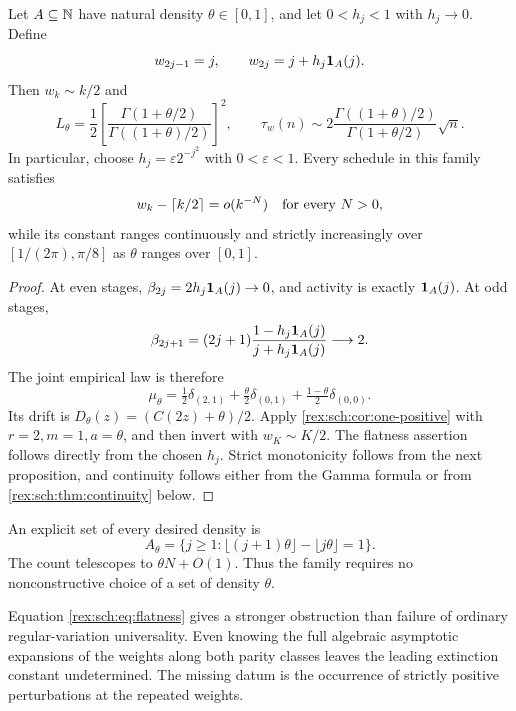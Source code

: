 \begin{theorem}
\label{rex:sch:thm:flat-perturbation}
Let $A\subseteq\mathbb N$ have natural density $\theta\in[0,1]$, and let
$0<h_j<1$ with $h_j\to0$. Define
\begin{equation}\label{rex:sch:eq:density-weights}
 w_{2j-1}=j,\qquad w_{2j}=j+h_j\mathbf 1_A(j).
\end{equation}
Then $w_k\sim k/2$ and
\begin{equation}\label{rex:sch:eq:density-L}
 \boxed{\displaystyle
 L_\theta=\frac12
 \left[\frac{\Gamma(1+\theta/2)}
 {\Gamma((1+\theta)/2)}\right]^2,\qquad
 \tau_w(n)\sim
 2\frac{\Gamma((1+\theta)/2)}{\Gamma(1+\theta/2)}\sqrt n.}
\end{equation}
In particular, choose $h_j=\varepsilon2^{-j^2}$ with $0<\varepsilon<1$.
Every schedule in this family satisfies
\begin{equation}\label{rex:sch:eq:flatness}
 w_k-\left\lceil k/2\right\rceil=o(k^{-N})\quad\text{for every }N>0,
\end{equation}
while its constant ranges continuously and strictly increasingly over
$[1/(2\pi),\pi/8]$ as $\theta$ ranges over $[0,1]$.
\end{theorem}

\begin{proof}
At even stages,
$\beta_{2j}=2h_j\mathbf 1_A(j)\to0$, and activity is exactly
$\mathbf 1_A(j)$. At odd stages,
\[
 \beta_{2j+1}
 =(2j+1)\frac{1-h_j\mathbf 1_A(j)}{j+h_j\mathbf 1_A(j)}\longrightarrow2.
\]
The joint empirical law is therefore
\[
 \mu_\theta=\tfrac12\delta_{(2,1)}
 +\tfrac\theta2\delta_{(0,1)}
 +\tfrac{1-\theta}{2}\delta_{(0,0)}.
\]
Its drift is $D_\theta(z)=(C(2z)+\theta)/2$.
Apply \cref{rex:sch:cor:one-positive} with $r=2,m=1,a=\theta$, and then
invert with $w_K\sim K/2$. The flatness assertion follows directly
from the chosen $h_j$. Strict monotonicity follows from the next
proposition, and continuity follows either from the Gamma formula
or from \cref{rex:sch:thm:continuity} below.
\end{proof}

An explicit set of every desired density is
\begin{equation}\label{rex:sch:eq:density-set}
 A_\theta=\{j\geq1:
 \lfloor(j+1)\theta\rfloor-\lfloor j\theta\rfloor=1\}.
\end{equation}
The count telescopes to $\theta N+O(1)$. Thus the family requires no
nonconstructive choice of a set of density $\theta$.

Equation \eqref{rex:sch:eq:flatness} gives a stronger obstruction than failure
of ordinary regular-variation universality. Even knowing the full
algebraic asymptotic expansions of the weights along both parity
classes leaves the leading extinction constant undetermined. The
missing datum is the occurrence of strictly positive perturbations
at the repeated weights.

